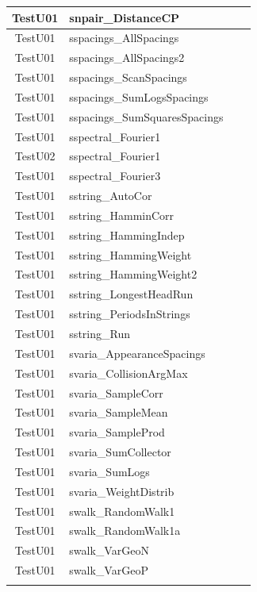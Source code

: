 \documentclass[12pt,a4paper,fullpage]{article}
\begin{document}
\begin{longtable}{|c|>{\raggedright\arraybackslash}p{3cm}|l|>{\raggedright\arraybackslash}p{4cm}|}
TestU01 & snpair\_DistanceCP& & \\ \hline %
%
TestU01 & sspacings\_AllSpacings& & \\ \hline %
TestU01 & sspacings\_AllSpacings2& & \\ \hline %
TestU01 & sspacings\_ScanSpacings& & \\ \hline %
TestU01 & sspacings\_SumLogsSpacings& & \\ \hline %
TestU01 & sspacings\_SumSquaresSpacings& & \\ \hline %
%
TestU01 & sspectral\_Fourier1& & \\ \hline %
TestU02 & sspectral\_Fourier1& & \\ \hline %
TestU01 & sspectral\_Fourier3& & \\ \hline %
%
TestU01 & sstring\_AutoCor& & \\ \hline %
TestU01 & sstring\_HamminCorr& & \\ \hline %
TestU01 & sstring\_HammingIndep & &\\ \hline %
TestU01 & sstring\_HammingWeight& & \\ \hline %
TestU01 & sstring\_HammingWeight2& & \\ \hline %
TestU01 & sstring\_LongestHeadRun& & \\ \hline %
TestU01 & sstring\_PeriodsInStrings& & \\ \hline %
TestU01 & sstring\_Run& & \\ \hline %
%
TestU01 & svaria\_AppearanceSpacings & &\\ \hline %
TestU01 & svaria\_CollisionArgMax& & \\ \hline %
TestU01 & svaria\_SampleCorr &  &\\ \hline %
TestU01 & svaria\_SampleMean &  &\\ \hline %
TestU01 & svaria\_SampleProd & & \\ \hline %
TestU01 & svaria\_SumCollector& & \\ \hline %
TestU01 & svaria\_SumLogs& & \\ \hline %
TestU01 & svaria\_WeightDistrib& & \\ \hline %
%
TestU01 & swalk\_RandomWalk1 & &\\ \hline %
TestU01 & swalk\_RandomWalk1a & &\\ \hline %
TestU01 & swalk\_VarGeoN& &\\ \hline %
TestU01 & swalk\_VarGeoP& &\\ \hline %
 \fi  
\end{longtable}
\end{document}
